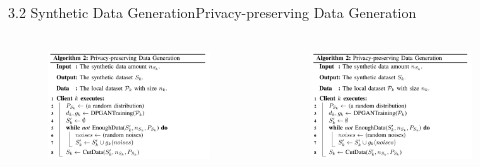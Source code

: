 \documentclass{sintefbeamer}
\theoremstyle{definition}
\begin{document}
\begin{frame}{3.2 Synthetic Data Generation}{Privacy-preserving Data Generation}


\begin{columns}
\begin{column}{0.5\textwidth}
\begin{figure}[ht]
\centering
\includegraphics[width=1\textwidth]{images/algo2_1}
\end{figure}

\end{column}
\begin{column}{0.5\textwidth}
\begin{figure}[ht]
\centering
\includegraphics[width=1\textwidth]{images/algo2_1}
\end{figure}
\end{column}
\end{columns}


\end{frame}
\end{document}
